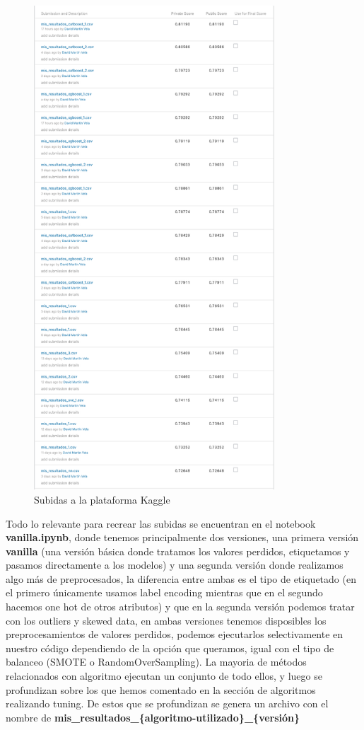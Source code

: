 \documentclass[12pt,twoside]{report}
\begin{document}
\begin{figure}[H]
\begin{center}
\includegraphics[width=9cm]{../notebooks/figures/subidas.png}
\caption{Subidas a la plataforma Kaggle}
\label{fig:subidas}
\end{center}
\end{figure} 

Todo lo relevante para recrear las subidas se encuentran en el notebook \textbf{vanilla.ipynb}, donde tenemos principalmente dos versiones, una primera versión \textbf{vanilla} (una versión básica donde tratamos los valores perdidos, etiquetamos y pasamos directamente a los modelos) y una segunda versión donde realizamos algo más de preprocesados, la diferencia entre ambas es el tipo de etiquetado (en el primero únicamente usamos label encoding mientras que en el segundo hacemos one hot de otros atributos) y que en la segunda versión podemos tratar con los outliers y skewed data, en ambas versiones tenemos disposibles los preprocesamientos de valores perdidos, podemos ejecutarlos selectivamente en nuestro código dependiendo de la opción que queramos, igual con el tipo de balanceo (SMOTE o RandomOverSampling). La mayoria de métodos relacionados con algoritmo ejecutan un conjunto de todo ellos, y luego se profundizan sobre los que hemos comentado en la sección de algoritmos realizando tuning. De estos que se profundizan se genera un archivo con el nombre de \textbf{mis\_resultados\_\{algoritmo-utilizado\}\_\{versión\}}
\end{document}
